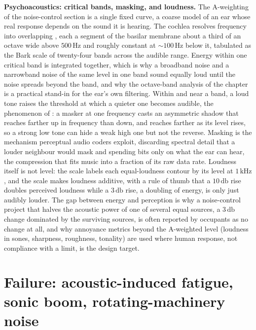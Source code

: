\begin{mastery}
\textbf{Psychoacoustics: critical bands, masking, and loudness.} The
A-weighting of the noise-control section is a single fixed curve, a coarse
model of an ear whose real response depends on the sound it is hearing. The
cochlea resolves frequency into overlapping , each a
segment of the basilar membrane about a third of an octave wide above
$500\,\si{\hertz}$ and roughly constant at $\sim 100\,\si{\hertz}$ below it,
tabulated as the Bark scale of twenty-four bands across the audible range.
Energy within one critical band is integrated together, which is why a
broadband noise and a narrowband noise of the same level in one band sound
equally loud until the noise spreads beyond the band, and why the octave-band
analysis of the chapter is a practical stand-in for the ear's own filtering.
Within and near a band, a loud tone raises the threshold at which a quieter
one becomes audible, the phenomenon of : a masker at one
frequency casts an asymmetric shadow that reaches farther up in frequency
than down, and reaches farther as its level rises, so a strong low tone can
hide a weak high one but not the reverse. Masking is the mechanism perceptual
audio coders exploit, discarding spectral detail that a louder neighbour
would mask and spending bits only on what the ear can hear, the compression
that fits music into a fraction of its raw data rate. Loudness itself is not
level: the  scale labels each equal-loudness contour by its
level at $1\,\si{\kilo\hertz}$, and the  scale makes loudness
additive, with a rule of thumb that a $10\,\si{\decibel}$ rise doubles
perceived loudness while a $3\,\si{\decibel}$ rise, a doubling of energy, is
only just audibly louder. The gap between energy and perception is why a
noise-control project that halves the acoustic power of one of several equal
sources, a $3\,\si{\decibel}$ change dominated by the surviving sources, is
often reported by occupants as no change at all, and why annoyance metrics
beyond the A-weighted level (loudness in sones, sharpness, roughness,
tonality) are used where human response, not compliance with a limit, is the
design target.
\end{mastery}

\section{Failure: acoustic-induced fatigue, sonic boom,
rotating-machinery noise}

